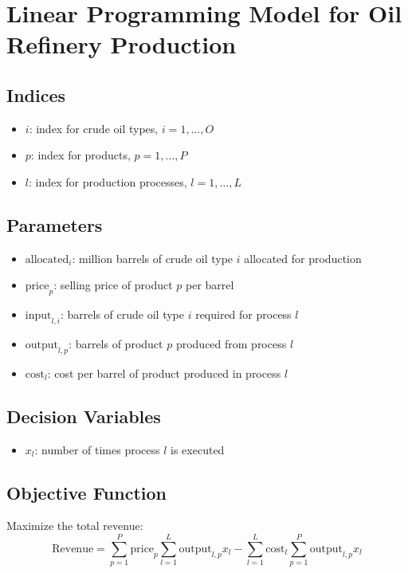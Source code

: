 \documentclass{article}
\begin{document}
\section*{Linear Programming Model for Oil Refinery Production}

\subsection*{Indices}
\begin{itemize}
    \item $i$: index for crude oil types, $i = 1, \ldots, O$
    \item $p$: index for products, $p = 1, \ldots, P$
    \item $l$: index for production processes, $l = 1, \ldots, L$
\end{itemize}

\subsection*{Parameters}
\begin{itemize}
    \item $\text{allocated}_i$: million barrels of crude oil type $i$ allocated for production
    \item $\text{price}_p$: selling price of product $p$ per barrel
    \item $\text{input}_{l,i}$: barrels of crude oil type $i$ required for process $l$
    \item $\text{output}_{l,p}$: barrels of product $p$ produced from process $l$
    \item $\text{cost}_l$: cost per barrel of product produced in process $l$
\end{itemize}

\subsection*{Decision Variables}
\begin{itemize}
    \item $x_l$: number of times process $l$ is executed
\end{itemize}

\subsection*{Objective Function}
Maximize the total revenue:
\[
\text{Revenue} = \sum_{p=1}^{P} \text{price}_p \sum_{l=1}^{L} \text{output}_{l,p} x_l - \sum_{l=1}^{L} \text{cost}_l \sum_{p=1}^{P} \text{output}_{l,p} x_l
\]
\end{document}
